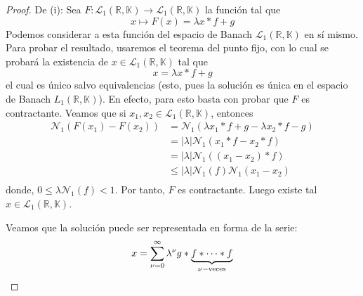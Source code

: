 \documentclass[12pt]{report}
\theoremstyle{largebreak}
\newcommand\abs[1]{\ensuremath{\big|#1\big|}}
\newcommand\cf[3]{\ensuremath{#1:#2\rightarrow#3}}
\newcommand{\N}[2]{\ensuremath{\mathcal{N}_{#1}\left(#2\right)}}
\begin{document}
    \begin{proof}
        De (i): Sea $\cf{F}{\mathcal{L}_1(\mathbb{R},\mathbb{K})}{\mathcal{L}_1(\mathbb{R},\mathbb{K})}$ la función tal que
        \begin{equation*}
            x\mapsto F(x)=\lambda x*f+g
        \end{equation*}
        Podemos considerar a esta función del espacio de Banach $\mathcal{L}_1(\mathbb{R},\mathbb{K})$ en sí mismo. Para probar el resultado, usaremos el teorema del punto fijo, con lo cual se probará la existencia de $x\in\mathcal{L}_1(\mathbb{R},\mathbb{K})$ tal que
        \begin{equation*}
            x=\lambda x*f+g
        \end{equation*}
        el cual es único salvo equivalencias (esto, pues la solución es única en el espacio de Banach $L_1(\mathbb{R},\mathbb{K})$). En efecto, para esto basta con probar que $F$ es contractante. Veamos que si $x_1,x_2\in\mathcal{L}_1(\mathbb{R},\mathbb{K})$, entonces
        \begin{equation*}
            \begin{split}
                \N{1}{F(x_1)-F(x_2)}&=\N{1}{\lambda x_1*f+g-\lambda x_2*f-g}\\
                &=\abs{\lambda}\N{1}{x_1*f-x_2*f}\\
                &=\abs{\lambda}\N{1}{(x_1-x_2)*f}\\
                &\leq\abs{\lambda}\N{1}{f}\N{1}{x_1-x_2}\\
            \end{split}
        \end{equation*}
        donde, $0\leq\lambda\N{1}{f}<1$. Por tanto, $F$ es contractante. Luego existe tal $x\in\mathcal{L}_1(\mathbb{R},\mathbb{K})$.

        Veamos que la solución puede ser representada en forma de la serie:
        \begin{equation*}
            x=\sum_{\nu=0}^\infty\lambda^\nu g*\underbrace{f*\cdots*f}_{\nu-\textup{veces}}
        \end{equation*}
        

\end{proof}
\end{document}
